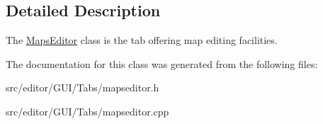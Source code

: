 \subsection{\-Detailed \-Description}
\-The \hyperlink{class_maps_editor}{\-Maps\-Editor} class is the tab offering map editing facilities. 

\-The documentation for this class was generated from the following files\-:\begin{DoxyCompactItemize}
\item 
src/editor/\-G\-U\-I/\-Tabs/mapseditor.\-h\item 
src/editor/\-G\-U\-I/\-Tabs/mapseditor.\-cpp\end{DoxyCompactItemize}
